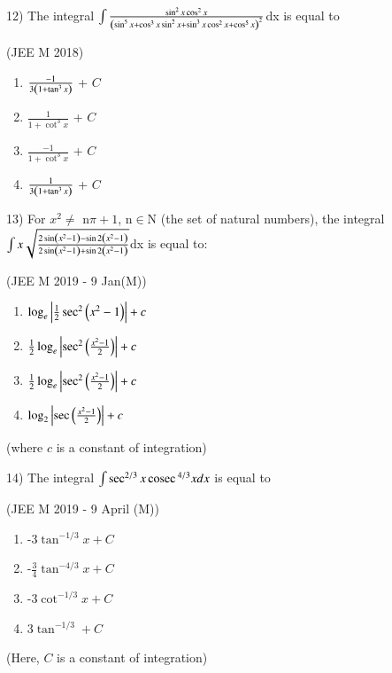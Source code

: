 \documentclass[journal,12pt,twocolumn]{IEEEtran}
\theoremstyle{remark}
\begin{document}
12)
	 The integral $\int\frac{\sin^2x\cos^2x}{\left(\sin^5x+\cos^3x\sin^2x+\sin^3x\cos^2x+\cos^5x\right)^2}$dx is equal to

		\hfill{(JEE M 2018)}
		
		\begin{multicols}{2}
			\begin{enumerate}
				\item $\frac{-1}{3\left(1+\tan ^3x\right)}$ + $C$
				\item $\frac{1}{1+\cot ^3x}$ + $C$
				\item $\frac{-1}{1+\cot ^3x}$ + $C$
				\item $\frac{1}{3\left(1+\tan ^3x\right)}$ + $C$
			\end{enumerate}
		\end{multicols}
		
13)
	 For $x^2\neq$ n$\pi+1$, n$\in$N (the set of natural numbers), the integral $\int x\sqrt{\frac{2\sin \left(x^2-1\right)-\sin 2\left(x^2-1\right)}{2\sin \left(x^2-1\right)+\sin 2\left(x^2-1\right)}}$dx is equal to:

		\hfill{(JEE M 2019 - 9 Jan(M))}

		\begin{multicols}{1}
			\begin{enumerate}
				\item $\log_e\left\vert\frac{1}{2}\sec ^2\left(x^2-1\right)\right\vert + c$
				\item $\frac{1}{2}\log_e\left\vert\sec ^2\left(\frac{x^2-1}{2}\right)\right\vert + c$
				\item $\frac{1}{2}\log_e\left\vert\sec ^2\left(\frac{x^2-1}{2}\right)\right\vert + c$
				\item $\log_2\left\vert\sec \left(\frac{x^2-1}{2}\right)\right\vert + c$
			\end{enumerate}
		\end{multicols}
		(where $c$ is a constant of integration)

14)
	 The integral $\int \sec ^{2/3}x\,\text{cosec}\, ^{4/3}x dx$ is equal to

		\hfill{(JEE M 2019 - 9 April (M))}

		\begin{multicols}{2}
			\begin{enumerate}
				\item -3$\tan ^{-1/3}x+C$
				\item -$\frac{3}{4}\tan ^{-4/3}x+C$
				\item -3$\cot ^{-1/3}x+C$
				\item 3$\tan ^{-1/3}+C$
			\end{enumerate}
		\end{multicols}
		(Here, $C$ is a constant of integration)
\end{document}
